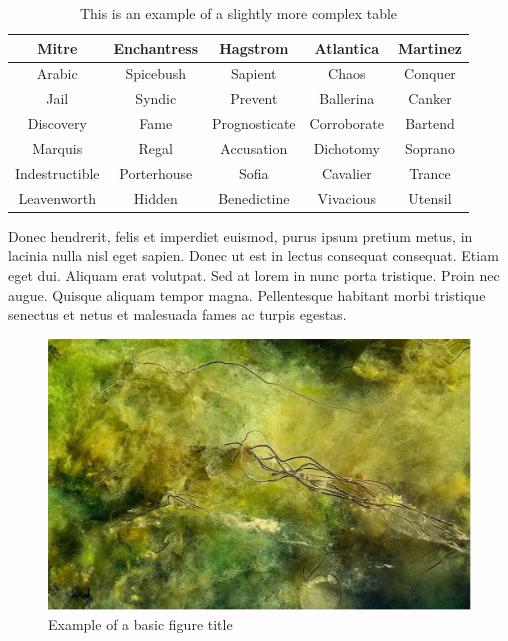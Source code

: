 \begin{table}
\centering
\begin{tabular}{|ccccc|}
\hline
\textbf{Mitre} & \textbf{Enchantress} & \textbf{Hagstrom} &
\textbf{Atlantica} & \textbf{Martinez} \\
\hline
Arabic & Spicebush & Sapient & Chaos & Conquer \\
Jail & Syndic & Prevent & Ballerina & Canker \\
Discovery & Fame & Prognosticate & Corroborate & Bartend \\
Marquis & Regal & Accusation & Dichotomy & Soprano \\
Indestructible  & Porterhouse & Sofia & Cavalier & Trance \\
Leavenworth & Hidden & Benedictine & Vivacious & Utensil \\
\hline
\end{tabular}
\caption{This is an example of a slightly more complex table}
\label{table:less_simple}
\end{table}

Donec hendrerit, felis et imperdiet euismod, purus ipsum pretium metus, in lacinia nulla nisl eget sapien. Donec ut est in lectus consequat consequat. Etiam eget dui. Aliquam erat volutpat. Sed at lorem in nunc porta tristique. Proin nec augue. Quisque aliquam tempor magna. Pellentesque habitant morbi tristique senectus et netus et malesuada fames ac turpis egestas.\par

\begin{figure}
\includegraphics[scale=.45]{figures/Picture2}

\caption{Example of a basic figure title}
\label{fig:green_thing}
\end{figure}

